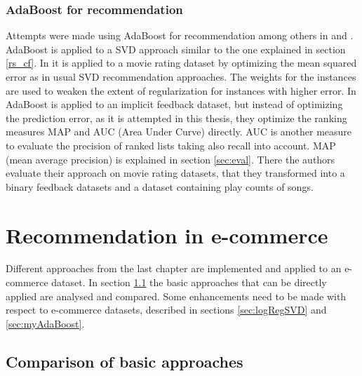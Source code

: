 \documentclass[10pt]{reportMaster}
\begin{document}
\subsection*{AdaBoost for recommendation}
\label{sec:adaBoostForRecommendation}
Attempts were made using AdaBoost for recommendation among others in \cite{boostingCFRatings} and \cite{boostingAUC}.
AdaBoost is applied to a SVD approach similar to the one explained in section \ref{rs_cf}.
In \cite{boostingCFRatings} it is applied to a movie rating dataset by optimizing the mean squared error as in usual SVD recommendation approaches.
The weights for the instances are used to weaken the extent of regularization for instances with higher error.
In \cite{boostingAUC} AdaBoost is applied to an implicit feedback dataset, but instead of optimizing the prediction error, as it is attempted in this thesis, they optimize the ranking measures MAP and AUC (Area Under Curve) directly.
AUC is another measure to evaluate the precision of ranked lists taking also recall into account.
MAP (mean average precision) is explained in section \ref{sec:eval}.
There the authors evaluate their approach on movie rating datasets, that they transformed into a binary feedback datasets and a dataset containing play counts of songs.











\chapter{Recommendation in e-commerce}
\label{sec:ecommerceRec}

Different approaches from the last chapter are implemented and applied to an e-commerce dataset.
In section \ref{sec:comparison} the basic approaches that can be directly applied are analysed and compared.
Some enhancements need to be made with respect to e-commerce datasets, described in sections \ref{sec:logRegSVD} and \ref{sec:myAdaBoost}.


\section{Comparison of basic approaches}
\label{sec:comparison}
\end{document}
